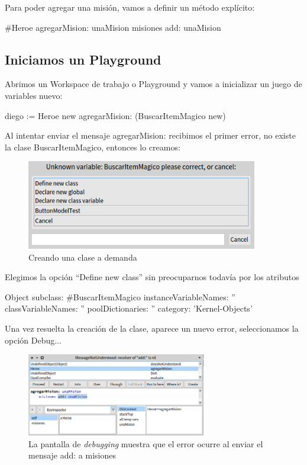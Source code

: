 \documentclass[a4paper,12pt]{book}
\begin{document}
Para poder agregar una misión, vamos a definir un método explícito:

\begin{code}
#Heroe
agregarMision: unaMision
  misiones add: unaMision
\end{code}

\subsection{Iniciamos un Playground}
Abrimos un Workspace de trabajo o Playground y vamos a inicializar un juego de variables nuevo:

\begin{code}
diego := Heroe new
  agregarMision: (BuscarItemMagico new)
\end{code}

Al intentar enviar el mensaje agregarMision: recibimos el primer error, no existe la clase BuscarItemMagico,
entonces lo creamos:

\begin{figure}[h!]
    \centering	
    \includegraphics[width=0.9\textwidth]{images/16_crear_nueva_clase.png}
    \caption{Creando una clase a demanda}
\end{figure}
\FloatBarrier

Elegimos la opción ``Define new class'' sin preocuparnos todavía por los atributos

\begin{code}
Object subclass: #BuscarItemMagico
		instanceVariableNames: '' 
		classVariableNames: ''
		poolDictionaries: ''
		category: 'Kernel-Objects'
\end{code}

Una vez resuelta la creación de la clase, aparece un nuevo error, seleccionamos la opción Debug...

\begin{figure}[h!]
    \centering	
    \includegraphics[width=0.7\textwidth]{images/11_error_agregarMision.png}
    \caption{La pantalla de \textit{debugging} muestra que el error ocurre al enviar el mensaje add: a misiones}
\end{figure}
\FloatBarrier
\end{document}
